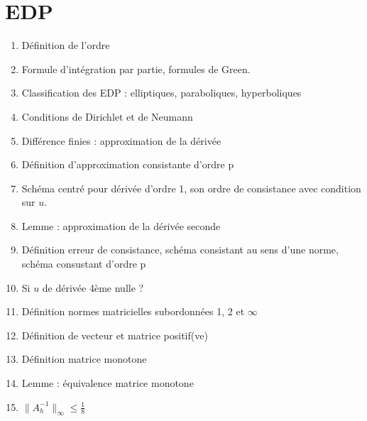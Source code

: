 \documentclass[11pt, twocolumn, landscape]{article}
\begin{document}
\newpage
\part{EDP}
\begin{enumerate}
\section{Cas d'une EDP en espace}
\item Définition de l'ordre
\item Formule d'intégration par partie, formules de Green.
\item Classification des EDP : elliptiques, paraboliques, hyperboliques
\item Conditions de Dirichlet et de Neumann
\item Différence finies : approximation de la dérivée
\item Définition d'approximation consistante d'ordre p
\item Schéma centré pour dérivée d'ordre 1, son ordre de consistance avec condition sur $u$.
\item Lemme : approximation de la dérivée seconde
\item Définition erreur de consistance, schéma consistant au sens d'une norme, schéma consustant d'ordre p
\item Si $u$ de dérivée 4ème nulle ?
\item Définition normes matricielles subordonnées 1, 2 et $\infty$
\item Définition de vecteur et matrice positif(ve)
\item Définition matrice monotone
\item Lemme : équivalence matrice monotone
\item \textbf{$\|A_h^{-1}\|_{\infty}\leq \frac{1}{8}$}

\end{enumerate}
\end{document}
